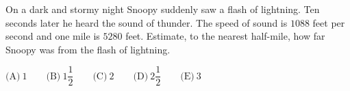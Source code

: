 On a dark and stormy night Snoopy suddenly saw a flash of lightning. Ten seconds later he heard the sound of thunder. The speed of sound is $1088$ feet per second and one mile is $5280$ feet. Estimate, to the nearest half-mile, how far Snoopy was from the flash of lightning.

$\text{(A)}\ 1\qquad\text{(B)}\ 1\dfrac{1}{2}\qquad\text{(C)}\ 2\qquad\text{(D)}\ 2\dfrac{1}{2}\qquad\text{(E)}\ 3$
